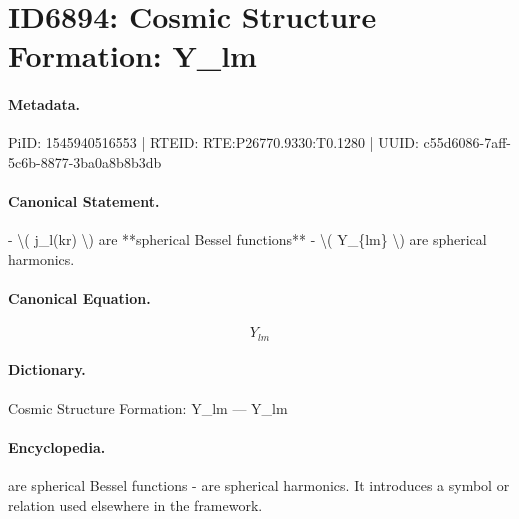 \section*{ID6894: Cosmic Structure Formation: Y\_lm}
\paragraph{Metadata.}
PiID: 1545940516553 | RTEID: RTE:P26770.9330:T0.1280 | UUID: c55d6086-7aff-5c6b-8877-3ba0a8b8b3db

\paragraph{Canonical Statement.}
- \textbackslash{}( j\_l(kr) \textbackslash{}) are **spherical Bessel functions** - \textbackslash{}( Y\_\{lm\} \textbackslash{}) are spherical harmonics.

\paragraph{Canonical Equation.}
\[
Y_{lm}
\]

\paragraph{Dictionary.}
Cosmic Structure Formation: Y\_lm — Y\_lm

\paragraph{Encyclopedia.}
are spherical Bessel functions - are spherical harmonics. It introduces a symbol or relation used elsewhere in the framework.
